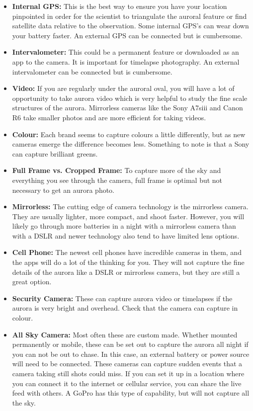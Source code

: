 \documentclass{article}
\begin{document}
\begin{itemize}
\item \textbf{Internal GPS:} This is the best way to ensure you have your location pinpointed in order for the scientist to triangulate the auroral feature or find satellite data relative to the observation. Some internal GPS's can wear down your battery faster.  An external GPS can be connected but is cumbersome. 

\item \textbf{Intervalometer:} This could be a permanent feature or downloaded as an app to the camera. It is important for timelapse photography. An external intervalometer can be connected but is cumbersome.

\item \textbf{Video:} If you are regularly under the auroral oval, you will have a lot of opportunity to take aurora video which is very helpful to study the fine scale structures of the aurora. Mirrorless cameras like the Sony A7siii and Canon R6 take smaller photos and are more efficient for taking videos.

\item \textbf{Colour:} Each brand seems to capture colours a little differently, but as new cameras emerge the difference becomes less. Something to note is that a Sony can capture brilliant greens. 

\item \textbf{Full Frame vs. Cropped Frame:} To capture more of the sky and everything you see through the camera, full frame is optimal but not necessary to get an aurora photo.

\item \textbf{Mirrorless:} The cutting edge of camera technology is the mirrorless camera. They are usually lighter, more compact, and shoot faster. However, you will likely go through more batteries in a night with a mirrorless camera than with a DSLR and newer technology also tend to have limited lens options.

\item \textbf{Cell Phone:} The newest cell phones have incredible cameras in them, and the apps will do a lot of the thinking for you. They will not capture the fine details of the aurora like a DSLR or mirrorless camera, but they are still a great option.

\item \textbf{Security Camera:} These can capture aurora video or timelapses if the aurora is very bright and overhead. Check that the camera can capture in colour.

\item \textbf{All Sky Camera:} Most often these are custom made. Whether mounted permanently or mobile, these can be set out to capture the aurora all night if you can not be out to chase. In this case, an external battery or power source will need to be connected. These cameras can capture sudden events that a camera taking still shots could miss. If you can set it up in a location where you can connect it to the internet or cellular service, you can share the live feed with others. A GoPro has this type of capability, but will not capture all the sky.

\end{itemize}
\end{document}
